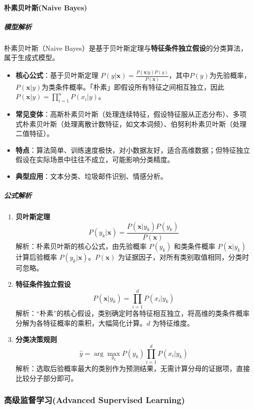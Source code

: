 \documentclass[12pt]{article}
\begin{document}
\paragraph{朴素贝叶斯(Naive Bayes)}
\subparagraph{模型解析}
朴素贝叶斯（Naive Bayes）是基于贝叶斯定理与\textbf{特征条件独立假设}的分类算法，属于生成式模型。
\begin{itemize}
    \item \textbf{核心公式}：基于贝叶斯定理 $P(y|\boldsymbol{x}) = \frac{P(\boldsymbol{x}|y)P(y)}{P(\boldsymbol{x})}$，其中$P(y)$为先验概率，$P(\boldsymbol{x}|y)$为类条件概率。「朴素」即假设所有特征之间相互独立，因此$P(\boldsymbol{x}|y)=\prod_{i=1}^n P(x_i|y)$。
    \item \textbf{常见变体}：高斯朴素贝叶斯（处理连续特征，假设特征服从正态分布）、多项式朴素贝叶斯（处理离散计数特征，如文本词频）、伯努利朴素贝叶斯（处理二值特征）。
    \item \textbf{特点}：算法简单、训练速度极快，对小数据友好，适合高维数据；但特征独立假设在实际场景中往往不成立，可能影响分类精度。
    \item \textbf{典型应用}：文本分类、垃圾邮件识别、情感分析。
\end{itemize}

\subparagraph{公式解析}
\begin{enumerate}
    \item \textbf{贝叶斯定理}
    \[
    P(y_k | \boldsymbol{x}) = \frac{P(\boldsymbol{x} | y_k) P(y_k)}{P(\boldsymbol{x})}
    \]
    解析：朴素贝叶斯的核心公式，由先验概率 $P(y_k)$ 和类条件概率 $P(\boldsymbol{x}|y_k)$ 计算后验概率 $P(y_k|\boldsymbol{x})$。$P(\boldsymbol{x})$ 为证据因子，对所有类别取值相同，分类时可忽略。

    \item \textbf{特征条件独立假设}
    \[
    P(\boldsymbol{x} | y_k) = \prod_{i=1}^d P(x_i | y_k)
    \]
    解析：“朴素”的核心假设，类别确定时各特征相互独立，将高维的类条件概率分解为各特征概率的乘积，大幅简化计算。$d$ 为特征维度。

    \item \textbf{分类决策规则}
    \[
    \hat{y} = \arg\max_{y_k} P(y_k) \prod_{i=1}^d P(x_i | y_k)
    \]
    解析：选取后验概率最大的类别作为预测结果，无需计算分母的证据项，直接比较分子部分即可。
\end{enumerate}

\subsubsection{高级监督学习(Advanced Supervised Learning)}
\end{document}
